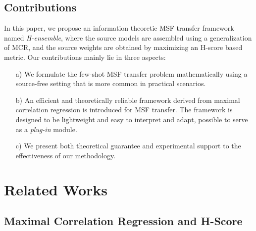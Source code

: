 \documentclass[letterpaper]{article} %
\begin{document}
\subsection{Contributions}
In this paper, we propose an information theoretic MSF transfer framework named \textit{H-ensemble}, where the source models are assembled using a generalization of MCR, and the source weights are obtained by maximizing an H-score based metric.
Our contributions mainly lie in three aspects:


\begin{itemize}
    \item[a)] We formulate the few-shot MSF transfer problem mathematically using a source-free setting that is more common in practical scenarios.


    \item[b)] An efficient and theoretically reliable framework derived from maximal correlation regression is introduced for MSF transfer. The framework is designed to be lightweight and easy to interpret and adapt, possible to serve as a \textit{plug-in} module.

    \item[c)] We present both theoretical guarantee and experimental support to the effectiveness of our methodology.


\end{itemize}

\section{Related Works}
\subsection{Maximal Correlation Regression and H-Score}\label{sec:H-score}
\end{document}
